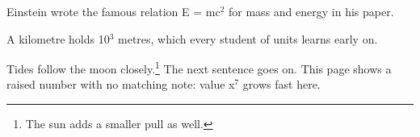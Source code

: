 \documentclass{article}
\begin{document}
Einstein wrote the famous relation E = mc$^2$ for mass and energy in his paper.

A kilometre holds 10$^3$ metres, which every student of units learns early on.

Tides follow the moon closely.\footnote{The sun adds a smaller pull as well.} The next sentence goes on.
\newpage
This page shows a raised number with no matching note: value x$^7$ grows fast here.
\end{document}
